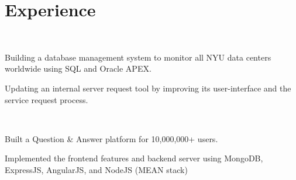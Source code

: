 \section{Experience}

\\
\vspace{0.9em} %
\begin{tightemize}
\item Building a database management system to monitor all NYU data centers worldwide using SQL and Oracle APEX.
\item Updating an internal server request tool by improving its user-interface and the service request process.
\end{tightemize}
\sectionsep


 \\
\begin{tightemize}
\item Built a Question \& Answer platform for 10,000,000+ users.
\item Implemented the frontend features and backend server using MongoDB, ExpressJS, AngularJS, and NodeJS (MEAN stack)
\end{tightemize}
\sectionsep
